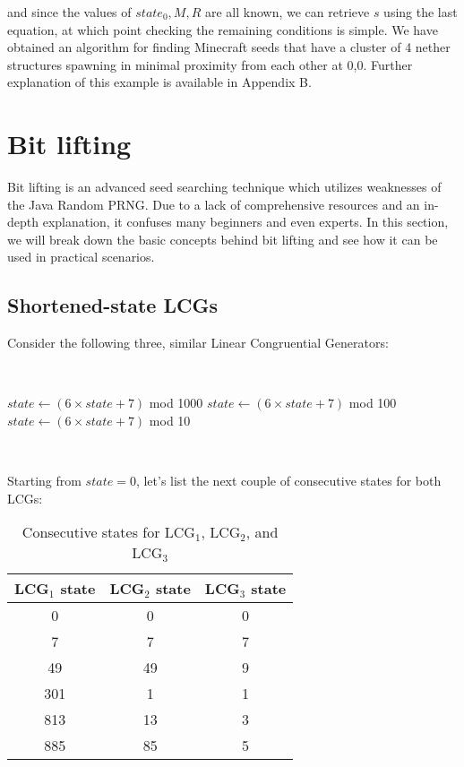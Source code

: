 \documentclass{article}
\begin{document}
and since the values of $state_0, M, R$ are all known, we can retrieve $s$ using the last equation, at which point checking the remaining conditions is simple. We have obtained an algorithm for finding Minecraft seeds that have a cluster of 4 nether structures spawning in minimal proximity from each other at 0,0. Further explanation of this example is available in Appendix B. %


\section{Bit lifting}

Bit lifting is an advanced seed searching technique which utilizes weaknesses of the Java Random PRNG. Due to a lack of comprehensive resources and an in-depth explanation, it confuses many beginners and even experts. In this section, we will break down the basic concepts behind bit lifting and see how it can be used in practical scenarios.

\subsection{Shortened-state LCGs}

Consider the following three, similar Linear Congruential Generators:

\
\begin{algorithmic}
    \State $state \gets (6 \times state + 7)$ mod 1000
    \State $state \gets (6 \times state + 7)$ mod 100
    \State $state \gets (6 \times state + 7)$ mod 10
\end{algorithmic}
\ \

\noindent Starting from $state = 0$, let’s list the next couple of consecutive states for both LCGs:

\begin{table}[h]
    \centering
    \begin{tabular}{|c|c|c|}
    \hline
         LCG$_1$ state & LCG$_2$ state & LCG$_3$ state \\
    \hline
         0 & 0 & 0   \\
         7 & 7 & 7   \\
         49 & 49 & 9  \\
         301 & 1 & 1   \\
         813 & 13 & 3  \\
         885 & 85 & 5  \\
    \hline
    \end{tabular}
    \caption{Consecutive states for LCG$_1$, LCG$_2$, and LCG$_3$}
    \label{tab:lcgs}
\end{table}
\end{document}
